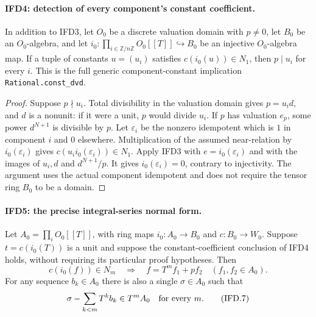 \paragraph{IFD4: detection of every component's constant coefficient.}
\label{claim:IFD4}
In addition to IFD3, let $O_0$ be a discrete valuation domain with
$p\ne0$, let $B_0$ be an $O_0$-algebra, and let
$i_0:\prod_{i\in\mathbb Z/n\mathbb Z}O_0[[T]]\hookrightarrow B_0$
be an injective $O_0$-algebra map.
If a tuple of constants $u=(u_i)$ satisfies
$c(i_0(u))\in N_1$, then $p\mid u_i$ for every $i$.
This is the full generic component-constant implication
\texttt{Rational.const\_dvd}.

\begin{proof}
Suppose $p\nmid u_i$. Total divisibility in the valuation domain gives
$p=u_i d$, and $d$ is a nonunit: if it were a unit, $p$ would divide
$u_i$. If $p$ has valuation $e_p$, some power $d^{N+1}$ is divisible
by $p$. Let $\varepsilon_i$ be the nonzero idempotent which is $1$
in component $i$ and $0$ elsewhere. Multiplication of the assumed
near-relation by $i_0(\varepsilon_i)$ gives
$c(u_i i_0(\varepsilon_i))\in N_1$. Apply IFD3 with
$e=i_0(\varepsilon_i)$ and with the images of $u_i,d$ and
$d^{N+1}/p$. It gives $i_0(\varepsilon_i)=0$, contrary to injectivity.
The argument uses the actual component idempotent and does not require
the tensor ring $B_0$ to be a domain.
\end{proof}

\paragraph{IFD5: the precise integral-series normal form.}
\label{claim:IFD5}
Let $A_0=\prod_iO_0[[T]]$, with ring maps $i_0:A_0\to B_0$ and
$c:B_0\to W_0$. Suppose $t=c(i_0(T))$ is a unit and suppose the
constant-coefficient conclusion of IFD4 holds, without requiring its
particular proof hypotheses. Then
\[
 c(i_0(f))\in N_m\quad\Longrightarrow\quad
                   f=T^mf_1+pf_2\quad(f_1,f_2\in A_0).        \tag{IFD.6}
\]
For any sequence $b_k\in A_0$ there is also a single $\sigma\in A_0$
such that
\[
             \sigma-\sum_{k<m}T^kb_k\in T^mA_0
                                  \quad\hbox{for every }m.  \tag{IFD.7}
\]

